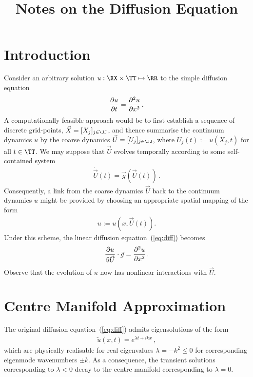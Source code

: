 \documentclass[12pt,a5paper]{article}
\title{Notes on the Diffusion Equation}
\begin{document}
\maketitle
{}
\section{Introduction}\label{sec:intro}
Consider an arbitrary solution $u:\XX\times \TT\mapsto \RR$ to the simple diffusion equation 
\begin{eqnarray}
	\D tu = \DD xu\,.
	\label{eq:diff}
\end{eqnarray}
A computationally feasible approach would be to 
first establish a sequence  of discrete grid-points,
${\vec X}=[X_j]_{j\in\JJ}$, and thence
summarise the continuum dynamics $u$ by the coarse dynamics
${\vec U}=[U_j]_{j\in\JJ}$, where $U_j(t):=u(X_j,t)$ for all $t\in \TT$.
We may suppose  that ${\vec U}$ evolves temporally according to some self-contained system
\begin{eqnarray}
	\dot{\vec U}(t) = {\vec g}({\vec U}(t))\,.
	\label{eq:temporal}
\end{eqnarray}
Consequently, a link from the coarse dynamics ${\vec U}$ back to the continuum dynamics $u$ might be provided
by choosing an appropriate spatial mapping of the form
\begin{eqnarray}
	u  := u(x,{\vec U}(t)).
	\label{eq:spatial}
\end{eqnarray}
Under this scheme, the linear diffusion equation~(\ref{eq:diff}) becomes
\begin{eqnarray}
	\D {\vec U}{u}\cdot{\vec g} = \DD x{u}\,.
	\label{eq:diff2}
\end{eqnarray}
Observe that the evolution of $u$ now has nonlinear interactions with ${\vec U}$.

\section{Centre Manifold Approximation}\label{sec:centre-man}
The original diffusion equation~(\ref{eq:diff}) admits 
eigensolutions of the form
\begin{eqnarray}
	\tilde{u}(x,t)  = e^{\lambda t+ikx}\,,
\label{eq:raw-eigmode}
\end{eqnarray}
which are physically realisable for real eigenvalues $\lambda=-k^2\le 0$ for 
corresponding eigenmode wavenumbers $\pm k$. 
As a consequence, the transient solutions corresponding
to $\lambda<0$ decay to the centre manifold corresponding to $\lambda=0$. 
\end{document}
